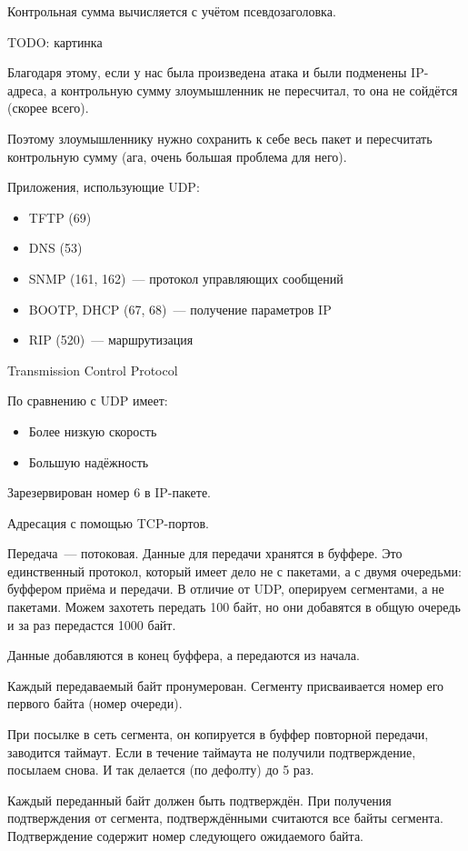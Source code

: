 Контрольная сумма вычисляется с учётом псевдозаголовка.

TODO: картинка

Благодаря этому, если у нас была произведена атака и были подменены IP-адреса, а контрольную сумму злоумышленник не пересчитал, то она не сойдётся (скорее всего).

Поэтому злоумышленнику нужно сохранить к себе весь пакет и пересчитать контрольную сумму (ага, очень большая проблема для него).

Приложения, использующие UDP:
\begin{itemize}
    \item TFTP (69)
    \item DNS (53)
    \item SNMP (161, 162)~--- протокол управляющих сообщений
    \item BOOTP, DHCP (67, 68)~--- получение параметров IP
    \item RIP (520)~--- маршрутизация
\end{itemize}


Transmission Control Protocol

По сравнению с UDP имеет:
\begin{itemize}
    \item Более низкую скорость
    \item Большую надёжность
\end{itemize}

Зарезервирован номер 6 в IP-пакете.

Адресация с помощью TCP-портов.

Передача~--- потоковая. Данные для передачи хранятся в буффере. Это единственный протокол, который имеет дело не с пакетами, а с двумя очередьми: буффером приёма и передачи. В отличие от UDP, оперируем сегментами, а не пакетами. Можем захотеть передать 100 байт, но они добавятся в общую очередь и за раз передастся 1000 байт.

Данные добавляются в конец буффера, а передаются из начала. 

Каждый передаваемый байт пронумерован. Сегменту присваивается номер его первого байта (номер очереди).

При посылке в сеть сегмента, он копируется в буффер повторной передачи, заводится таймаут. Если в течение таймаута не получили подтверждение, посылаем снова. И так делается (по дефолту) до 5 раз.

Каждый переданный байт должен быть подтверждён. При получения подтверждения от сегмента, подтверждёнными считаются все байты сегмента. Подтверждение содержит номер следующего ожидаемого байта.

